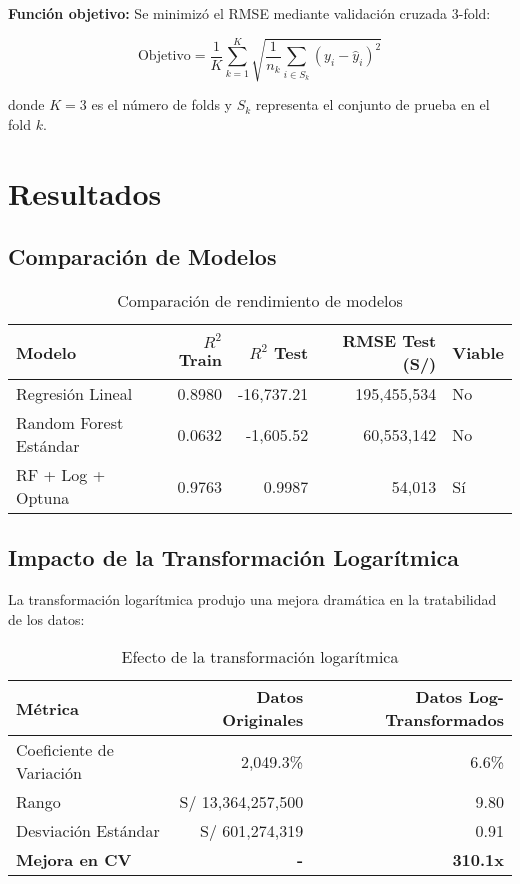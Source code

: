 \documentclass[12pt,a4paper]{article}
\begin{document}
\textbf{Función objetivo:}
Se minimizó el RMSE mediante validación cruzada 3-fold:

\begin{equation}
\text{Objetivo} = \frac{1}{K} \sum_{k=1}^{K} \sqrt{\frac{1}{n_k} \sum_{i \in S_k} (y_i - \hat{y}_i)^2}
\end{equation}

donde $K=3$ es el número de folds y $S_k$ representa el conjunto de prueba en el fold $k$.

\section{Resultados}

\subsection{Comparación de Modelos}

\begin{table}[H]
\centering
\caption{Comparación de rendimiento de modelos}
\begin{tabular}{lrrrl}
\toprule
\textbf{Modelo} & \textbf{$R^2$ Train} & \textbf{$R^2$ Test} & \textbf{RMSE Test (S/)} & \textbf{Viable} \\
\midrule
Regresión Lineal & 0.8980 & -16,737.21 & 195,455,534 & No \\
Random Forest Estándar & 0.0632 & -1,605.52 & 60,553,142 & No \\
RF + Log + Optuna & 0.9763 & 0.9987 & 54,013 & Sí \\
\bottomrule
\end{tabular}
\label{tab:comparacion_modelos}
\end{table}

\subsection{Impacto de la Transformación Logarítmica}

La transformación logarítmica produjo una mejora dramática en la tratabilidad de los datos:

\begin{table}[H]
\centering
\caption{Efecto de la transformación logarítmica}
\begin{tabular}{lrr}
\toprule
\textbf{Métrica} & \textbf{Datos Originales} & \textbf{Datos Log-Transformados} \\
\midrule
Coeficiente de Variación & 2,049.3\% & 6.6\% \\
Rango & S/ 13,364,257,500 & 9.80 \\
Desviación Estándar & S/ 601,274,319 & 0.91 \\
\textbf{Mejora en CV} & \textbf{-} & \textbf{310.1x} \\
\bottomrule
\end{tabular}
\label{tab:transformacion_logaritmica}
\end{table}
\end{document}
